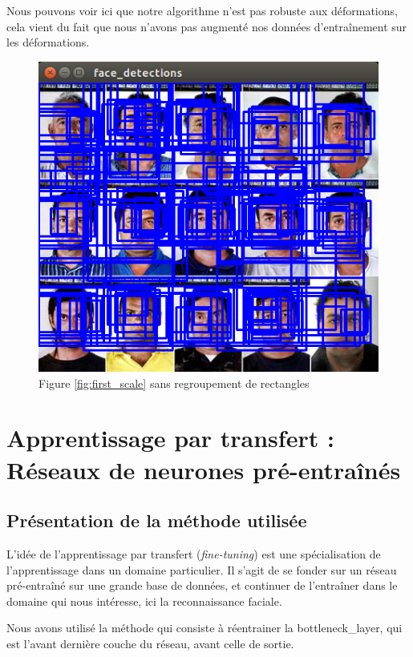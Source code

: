 \documentclass[a4paper,11pt]{article}
\begin{document}
	Nous pouvons voir ici que notre algorithme n'est pas robuste aux déformations, cela vient du
	fait que nous n'avons pas augmenté nos données d'entraînement sur les déformations.


	\begin{figure}[H]
	    \centering
	    \includegraphics[scale=0.3]{without_filter.png}
	    \caption{Figure \ref{fig:first_scale} sans regroupement de rectangles}
	    \label{fig:without_filter}
	\end{figure}


\section{Apprentissage par transfert : Réseaux de neurones pré-entraînés}
\subsection{Présentation de la méthode utilisée}
\label{sec:transfert_learning}

L'idée de l'apprentissage par transfert (\textit{fine-tuning}) est une spécialisation de
l'apprentissage dans un domaine particulier. Il s'agit de se fonder sur un réseau pré-entraîné sur une grande base de données, et continuer de l'entraîner dans le domaine qui nous intéresse, ici la reconnaissance faciale.

Nous avons utilisé la méthode qui consiste à réentrainer la bottleneck\_layer, qui est l'avant dernière couche du réseau, avant celle de sortie.
\end{document}
